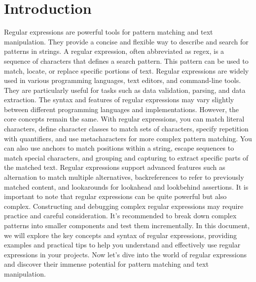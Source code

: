 \documentclass{report}
\begin{document}
    \section{Introduction}
    Regular expressions are powerful tools for pattern matching and text manipulation. They provide a concise and flexible way to describe and search for patterns in strings.
    \bigbreak \noindent 
    A regular expression, often abbreviated as regex, is a sequence of characters that defines a search pattern. This pattern can be used to match, locate, or replace specific portions of text.
    \bigbreak \noindent 
    Regular expressions are widely used in various programming languages, text editors, and command-line tools. They are particularly useful for tasks such as data validation, parsing, and data extraction.
    \bigbreak \noindent 
    The syntax and features of regular expressions may vary slightly between different programming languages and implementations. However, the core concepts remain the same.
    \bigbreak \noindent 
    With regular expressions, you can match literal characters, define character classes to match sets of characters, specify repetition with quantifiers, and use metacharacters for more complex pattern matching. You can also use anchors to match positions within a string, escape sequences to match special characters, and grouping and capturing to extract specific parts of the matched text.
    \bigbreak \noindent 
    Regular expressions support advanced features such as alternation to match multiple alternatives, backreferences to refer to previously matched content, and lookarounds for lookahead and lookbehind assertions.
    \bigbreak \noindent 
    It is important to note that regular expressions can be quite powerful but also complex. Constructing and debugging complex regular expressions may require practice and careful consideration. It's recommended to break down complex patterns into smaller components and test them incrementally.
    \bigbreak \noindent 
    In this document, we will explore the key concepts and syntax of regular expressions, providing examples and practical tips to help you understand and effectively use regular expressions in your projects.
    \bigbreak \noindent 
    Now let's dive into the world of regular expressions and discover their immense potential for pattern matching and text manipulation.

    \pagebreak \bigbreak \noindent
\end{document}
